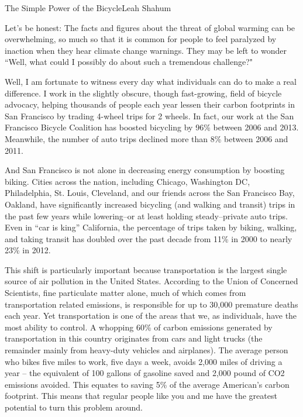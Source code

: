 \documentclass[10pt]{papertex}
\begin{document}
\makeatletter
\renewcommand{\papertex@headDateTime}{
    \raisebox{-5pt}
    {\fontsize{5mm}{6mm}\usefont{T1}{bch}{b}{n}{April 2014}}
    }
\makeatother

\begin{news}{2}{The Simple Power of the Bicycle}{Leah Shahum}{}{}

Let's be honest: The facts and figures about the threat of global warming can be
overwhelming, so much so that it is common for people to feel paralyzed by
inaction when they hear climate change warnings. They may be left to wonder
``Well, what could I possibly do about such a tremendous challenge?"

Well, I am fortunate to witness every day what individuals can do to make a real
difference. I work in the slightly obscure, though fast-growing, field of
bicycle advocacy, helping thousands of people each year lessen their carbon
footprints in San Francisco by trading 4-wheel trips for 2 wheels. In fact, our
work at the San Francisco Bicycle Coalition has boosted bicycling by 96\%
between 2006 and 2013. Meanwhile, the number of auto trips declined more than
8\% between 2006 and 2011.

And San Francisco is not alone in decreasing energy consumption by boosting
biking. Cities across the nation, including Chicago, Washington DC,
Philadelphia, St. Louis, Cleveland, and our friends across the San Francisco
Bay, Oakland, have significantly increased bicycling (and walking and transit)
trips in the past few years while lowering–or at least holding steady–private
auto trips. Even in “car is king” California, the percentage of trips taken by
biking, walking, and taking transit has doubled over the past decade from 11\%
in 2000 to nearly 23\% in 2012.

This shift is particularly important because transportation is the largest
single source of air pollution in the United States. According to the Union of
Concerned Scientists, fine particulate matter alone, much of which comes from
transportation related emissions, is responsible for up to 30,000 premature
deaths each year. Yet transportation is one of the areas that we, as
individuals, have the most ability to control. A whopping 60\% of carbon
emissions generated by transportation in this country originates from cars and
light trucks (the remainder mainly from heavy-duty vehicles and airplanes). The
average person who bikes five miles to work, five days a week, avoids 2,000
miles of driving a year – the equivalent of 100 gallons of gasoline saved and
2,000 pound of CO2 emissions avoided. This equates to saving 5\% of the average
American’s carbon footprint. This means that regular people like you and me have
the greatest potential to turn this problem around.


\end{news}
\end{document}
